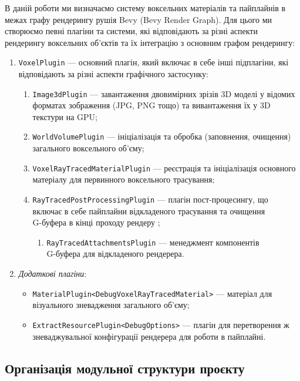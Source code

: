 В даній роботи ми визначаємо систему воксельних матеріалів та пайплайнів в межах графу рендерингу рушія Bevy (Bevy Render Graph). Для цього ми створюємо певні плагіни та системи, які відповідають за різні аспекти рендерингу воксельних об'єктів та їх інтеграцію з основним графом рендерингу:
\begin{enumerate}[itemsep=0pt, topsep=0pt]
    \item \texttt{VoxelPlugin} --- основний плагін, який включає в себе інші підплагіни, які відповідають за різні аспекти графічного застосунку: 
    \begin{enumerate}
        \item \texttt{Image3dPlugin} --- завантаження двовимірних зрізів 3D моделі у відомих форматах зображення (JPG, PNG тощо) та вивантаження їх у 3D текстури на GPU;
        \item \texttt{WorldVolumePlugin} --- ініціалізація та обробка (заповнення, очищення) загального воксельного об'єму;
        \item \texttt{VoxelRayTracedMaterialPlugin} --- реєстрація та ініціалізація ос\-новного матеріалу для первинного воксельного трасування;
        \item \texttt{RayTracedPostProcessingPlugin} --- плагін пост-процесингу, що\\включає в себе пайплайни відкладеного трасування та очищення\\G-буфера в кінці проходу рендеру ;
        \begin{enumerate}
            \item \texttt{RayTracedAttachmentsPlugin} --- менеджмент компонентів\\G-буфера для відкладеного рендерера.
        \end{enumerate}
    \end{enumerate}
    \item \textit{Додаткові плагіни}: 
    \begin{itemize}[itemsep=0pt, topsep=0pt, label=$\diamond$]
        \item \texttt{MaterialPlugin<DebugVoxelRayTracedMaterial>} --- матеріал для візуального зневадження загального об'єму;
        \item \texttt{ExtractResourcePlugin<DebugOptions>} --- плагін для перетворення ж зневаджувальної конфігурації рендерера для роботи в пайплайні.
    \end{itemize}
\end{enumerate}

\subsection{Організація модульної структури проєкту}

